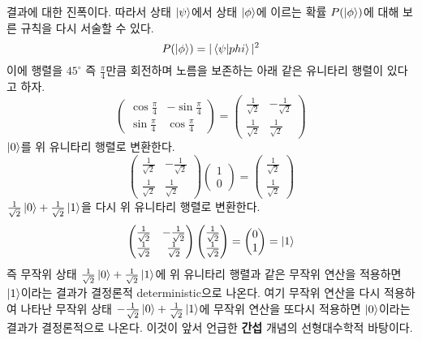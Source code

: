 \documentclass[a4paper,chapter,atbegshi]{oblivoir}
\begin{document}
결과에 대한 진폭이다. 따라서 상태 $\ket\psi$에서 상태 $\ket\phi$에 이르는
확률 $P(\ket\phi)$에 대해 보른 규칙을 다시 서술할 수 있다.
\[
  P(\ket\phi)=|\braket{\psi|phi}|^2
\]
이에 행렬을 $45^{\circ}$ 즉 $\frac{\pi}{4}$만큼 회전하며 노름을 보존하는
아래 같은 유니타리 행렬이 있다고 하자.
\[
  \begin{pmatrix}
    \cos\frac{\pi}{4} &-\sin\frac{\pi}{4}\\
    \sin\frac{\pi}{4} &\cos\frac{\pi}{4}
  \end{pmatrix}
  = \begin{pmatrix}
    \frac{1}{\sqrt{2}} &-\frac{1}{\sqrt{2}} \\
    \frac{1}{\sqrt{2}} &\frac{1}{\sqrt2}
  \end{pmatrix}
\]
$\ket0$를 위 유니타리 행렬로 변환한다.
\begin{equation}\label{eq:1-2}
  \begin{pmatrix}
    \frac{1}{\sqrt{2}} &-\frac{1}{\sqrt{2}} \\
    \frac{1}{\sqrt{2}} &\frac{1}{\sqrt2}
  \end{pmatrix}
  \begin{pmatrix}
    1\\0
  \end{pmatrix}
  =\begin{pmatrix}
    \frac{1}{\sqrt2}\\\frac{1}{\sqrt2}
  \end{pmatrix}
\end{equation}
$\frac{1}{\sqrt2}\ket{0}+\frac{1}{\sqrt2}\ket{1}$을 다시 위 유니타리 행렬로
변환한다.
\[
  \begin{pmatrix}
    \frac{1}{\sqrt{2}} &-\frac{1}{\sqrt{2}} \\
    \frac{1}{\sqrt{2}} &\frac{1}{\sqrt2}
  \end{pmatrix}
  \begin{pmatrix}
    \frac{1}{\sqrt2}\\\frac{1}{\sqrt2}
  \end{pmatrix}
  =\begin{pmatrix}0\\1\end{pmatrix}=\ket{1}
\]
즉 무작위 상태 $\frac{1}{\sqrt2}\ket{0}+\frac{1}{\sqrt2}\ket{1}$에 위 유니타리
행렬과 같은 무작위 연산을 적용하면 $\ket{1}$이라는 결과가 결정론적{\tiny
deterministic}으로 나온다. 여기 무작위 연산을 다시 적용하여 나타난 무작위 상태
 $-\frac{1}{\sqrt2}\ket{0}+\frac{1}{\sqrt2}\ket{1}$에 무작위 연산을 또다시
 적용하면 $\ket{0}$이라는 결과가 결정론적으로 나온다. 이것이 앞서 언급한
 \textbf{간섭} 개념의 선형대수학적 바탕이다. 
\end{document}
